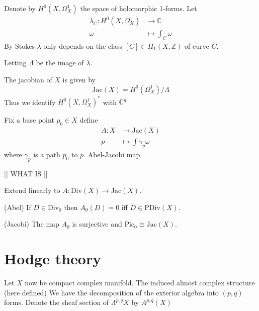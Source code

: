 Denote by $H^0 ( X, \Omega_X ^ 1) $ the space of holomorphic 1-forms.
Let
\begin{align}
    \lambda _ C : H^0 ( X, \Omega_X ^1 ) & \rightarrow  \mathbb{C} \\
    \omega & \mapsto \int _C \omega
\end{align}
By Stokes $\lambda$ only depends on the class $[C] \in H_1 (X, \mathbb{Z} ) $ of curve $C$. 

Letting $ \Lambda$ be the image of $\lambda$.

\begin{definition}
The jacobian of $ X$ is given by 
    \begin{equation}
        \mathrm{Jac}(X) = H^0 (\Omega^1 _X )/ \Lambda
    \end{equation}
    Thus we identify $H^0 ( X, \Omega^1 _X) ^* $ with $ \mathbb{C} ^ g$
\end{definition}

\begin{definition}
    Fix a base point $ p_0 \in X $ define 
    \begin{align}
        A: X & \rightarrow \mathrm{Jac}(X) \\
        p & \mapsto \int \gamma_p \omega 
    \end{align}
    where $ \gamma_p $ is a path $p_0 $ to $p $. 
    Abel-Jacobi map.
    
    [[ WHAT IS ]]

    Extend linearly to $ A : \mathrm{Div}(X) \rightarrow \mathrm{Jac} (X) $.
\end{definition}

\begin{theorem}
    (Abel) If $D \in \mathrm{Div}_0 $ then $A_0 (D) = 0 $ iff $D \in \mathrm{PDiv}(X)$.
\end{theorem}

\begin{theorem}
    (Jacobi) The map $A_0 $ is surjective and $\mathrm{Pic} _0 \cong \mathrm{Jac}(X)$.
\end{theorem}


\section{Hodge theory } %

Let $X$ now be compact complex manifold. 
The induced almost complex structure (here defined) 
We have the decomposition of the exterior algebra into $(p,q)$ forms. 
Denote the sheaf section of $ \Lambda^{p,q} X$ by $ A^{p,q} (X) $ 


